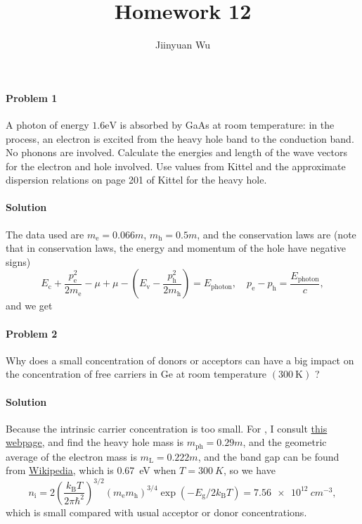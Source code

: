 \documentclass[hyperref, a4paper]{article}
\title{Homework 12}
\author{Jiinyuan Wu}
\begin{document}
    
\maketitle

\paragraph{Problem 1} A photon of energy $1.6 \mathrm{eV}$ is absorbed by GaAs at room temperature: in the process, an electron is excited from the heavy hole band to the conduction band. No phonons are involved. Calculate the energies and length of the wave vectors for the electron and hole involved. Use values from Kittel and the approximate dispersion relations on page 201 of Kittel for the heavy hole.

\paragraph{Solution} The data used are $m_{\text{e}} = 0.066m$, 
$m_{\text{h}} = 0.5 m$,
and the conservation laws are 
(note that in conservation laws, 
the energy and momentum of the hole 
have negative signs)
\begin{equation}
    E_{\text{c}} + \frac{p_{\text{e}}^2}{2m_{\text{e}}} - \mu + \mu - \left(E_{\text{v}} - \frac{p_{\text{h}}^2}{2m_{\text{h}}}\right)  = E_{\text{photon}}, \quad 
    p_{\text{e}} - p_{\text{h}} = \frac{E_{\text{photon}}}{c} ,
\end{equation}
and we get 


\paragraph{Problem 2} Why does a small concentration of donors or acceptors can have a big impact on the concentration of free carriers in Ge at room temperature $(300 \mathrm{~K})$ ?

\paragraph{Solution} Because the intrinsic carrier concentration is too small.
For , I consult \href{https://www.iue.tuwien.ac.at/phd/palankovski/node40.html}{this webpage},
and find the heavy hole mass is $m_{\text{ph}} = 0.29m$,
and the geometric average of the electron mass is 
$m_{\text{L}} = 0.222m$, 
and the band gap can be found from \href{https://en.wikipedia.org/wiki/Germanium}{Wikipedia},
which is \SI{0.67}{eV} when $T = \SI{300}{K}$,
so we have 
\begin{equation}
    n_{\mathrm{i}}=2\left(\frac{k_{\mathrm{B}} T}{2 \pi \hbar^2}\right)^{3 / 2}\left(m_{\mathrm{e}} m_{\mathrm{h}}\right)^{3 / 4} \exp \left(-E_{\mathrm{g}} / 2 k_{\mathrm{B}} T\right) = \SI{7.56e12}{cm^{-3}},
\end{equation}
which is small compared with usual acceptor or donor concentrations.
\end{document}
